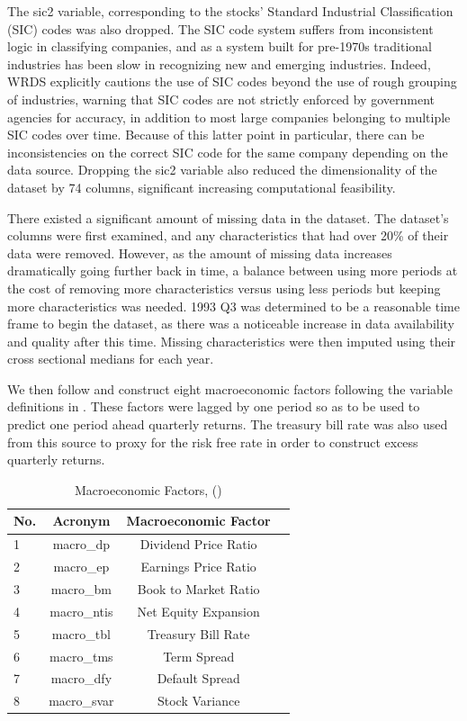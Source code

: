 \documentclass{article}
\begin{document}
The sic2 variable, corresponding to the stocks' Standard Industrial Classification (SIC) codes was also dropped. The SIC code system suffers from inconsistent logic in classifying companies, and as a system built for pre-1970s traditional industries has been slow in recognizing new and emerging industries. Indeed, WRDS explicitly cautions the use of SIC codes beyond the use of rough grouping of industries, warning that SIC codes are not strictly enforced by government agencies for accuracy, in addition to most large companies belonging to multiple SIC codes over time. Because of this latter point in particular, there can be inconsistencies on the correct SIC code for the same company depending on the data source. Dropping the sic2 variable also reduced the dimensionality of the dataset by 74 columns, significant increasing computational feasibility.

There existed a significant amount of missing data in the dataset. The dataset's columns were first examined, and any characteristics that had over 20\% of their data were removed. However, as the amount of missing data increases dramatically going further back in time, a balance between using more periods at the cost of removing more characteristics versus using less periods but keeping more characteristics was needed. 1993 Q3 was determined to be a reasonable time frame to begin the dataset, as there was a noticeable increase in data availability and quality after this time.  Missing characteristics were then imputed using their cross sectional medians for each year. 

We then follow \cite{gu_empirical_2018} and construct eight macroeconomic factors following the variable definitions in \cite{welch_comprehensive_2008}. These factors were lagged by one period so as to be used to predict one period ahead quarterly returns. The treasury bill rate was also used from this source to proxy for the risk free rate in order to construct excess quarterly returns. 

\begin{table}
	\caption{Macroeconomic Factors, (\cite{welch_comprehensive_2008})}
	\label{macro_factors}
	\begin{center}
		\begin{tabular}{lccc} \hline
			No. & Acronym & Macroeconomic Factor \\ \hline
			1 & macro\_dp & Dividend Price Ratio \\
			2 & macro\_ep & Earnings Price Ratio \\
			3 & macro\_bm & Book to Market Ratio \\
			4 & macro\_ntis & Net Equity Expansion \\
			5 & macro\_tbl & Treasury Bill Rate \\
			6 & macro\_tms & Term Spread \\
			7 & macro\_dfy & Default Spread \\
			8 & macro\_svar & Stock Variance \\ \hline
		\end{tabular}
	\end{center}
\end{table}
\end{document}
